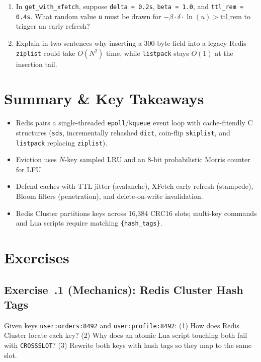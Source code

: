 \begin{tryityourselfbox}
\begin{enumerate}[leftmargin=18pt]
  \item In \texttt{get\_with\_xfetch}, suppose \texttt{delta = 0.2s}, \texttt{beta = 1.0}, and \texttt{ttl\_rem = 0.4s}. What random value \texttt{u} must be drawn for $-\beta \cdot \delta \cdot \ln(u) > \text{ttl\_rem}$ to trigger an early refresh?
  \item Explain in two sentences why inserting a 300-byte field into a legacy Redis \texttt{ziplist} could take $O(N^2)$ time, while \texttt{listpack} stays $O(1)$ at the insertion tail.
\end{enumerate}
\end{tryityourselfbox}

\section{Summary \protect\& Key Takeaways}
\begin{itemize}[leftmargin=18pt]
  \item Redis pairs a single-threaded \texttt{epoll}/\texttt{kqueue} event loop with cache-friendly C structures (\texttt{sds}, incrementally rehashed \texttt{dict}, coin-flip \texttt{skiplist}, and \texttt{listpack} replacing \texttt{ziplist}).
  \item Eviction uses $N$-key sampled LRU and an 8-bit probabilistic Morris counter for LFU.
  \item Defend caches with TTL jitter (avalanche), XFetch early refresh (stampede), Bloom filters (penetration), and delete-on-write invalidation.
  \item Redis Cluster partitions keys across 16,384 CRC16 slots; multi-key commands and Lua scripts require matching \texttt{\{hash\_tags\}}.
\end{itemize}

\section{Exercises}

\subsection*{Exercise~\thechapter.1 (Mechanics): Redis Cluster Hash Tags}
Given keys \texttt{user:orders:8492} and \texttt{user:profile:8492}: (1) How does Redis Cluster locate each key? (2) Why does an atomic Lua script touching both fail with \texttt{CROSSSLOT}? (3) Rewrite both keys with hash tags so they map to the same slot.

